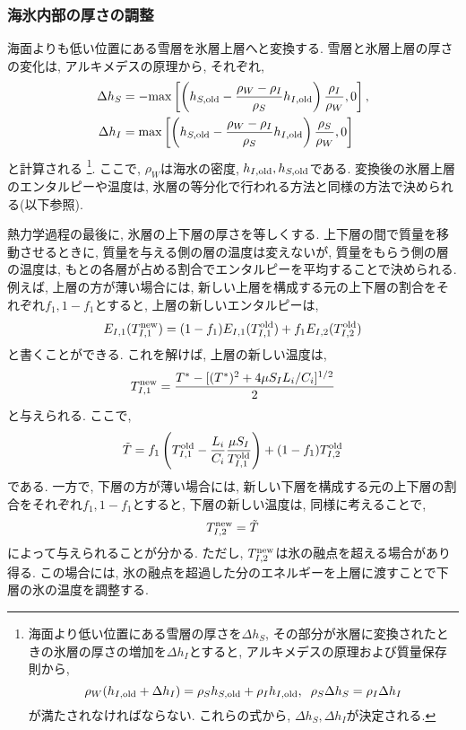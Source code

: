 \subsubsection*{海氷内部の厚さの調整}
海面よりも低い位置にある雪層を氷層上層へと変換する. 
雪層と氷層上層の厚さの変化は, アルキメデスの原理から,  
それぞれ, 
\begin{align*}
 \Delta h_S
 &= -{\rm max}
   \left[
    \left(h_{S,{\rm old}} - \dfrac{\rho_W-\rho_I}{\rho_S}h_{I,{\rm old}} \right)
    \dfrac{\rho_I}{\rho_W}, 0 \right], \\
 \Delta h_I
 &= {\rm max}
   \left[
   \left(h_{S,{\rm old}} - \dfrac{\rho_W-\rho_I}{\rho_S} h_{I,{\rm old}} \right)
   \dfrac{\rho_S}{\rho_W}, 0 \right]
\end{align*}
と計算される%
\footnote{
海面より低い位置にある雪層の厚さを$\Delta h_S$, 
その部分が氷層に変換されたときの氷層の厚さの増加を$\Delta h_I$とすると, 
アルキメデスの原理および質量保存則から, 
$$
\rho_W (h_{I,{\rm old}} + \Delta h_I)
   = \rho_S h_{S,{\rm old}} + \rho_I h_{I,{\rm old}},
\;\; 
\rho_S \Delta h_S = \rho_I \Delta h_I 
$$ 
が満たされなければならない. 
これらの式から, $\Delta h_S, \Delta h_I$が決定される. 
}. 
ここで, $\rho_W$は海水の密度, $h_{I,{\rm old}}, h_{S,{\rm old}}$である. 
変換後の氷層上層のエンタルピーや温度は, 氷層の等分化で行われる方法と同様の方法で決められる(以下参照).
 
熱力学過程の最後に, 氷層の上下層の厚さを等しくする. 
上下層の間で質量を移動させるときに, 質量を与える側の層の温度は変えないが, 
質量をもらう側の層の温度は, もとの各層が占める割合でエンタルピーを平均することで決められる.
例えば, 上層の方が薄い場合には, 新しい上層を構成する元の上下層の割合をそれぞれ$f_1, 1 - f_1$とすると, 
上層の新しいエンタルピーは, 
\begin{align*}
  E_{I,1}(T_{I,1}^{\rm new})
  = (1 - f_1) E_{I,1}(T_{I,1}^{\rm old}) + f_1 E_{I,2}(T_{I,2}^{\rm old})
\end{align*}
%
と書くことができる. 
これを解けば, 上層の新しい温度は, 
\begin{align*}
  T_{I,1}^{\rm new}
   = \dfrac{T^* - [(T^*)^2 + 4\mu S_I L_i /C_i]^{1/2}}{2}
\end{align*}
と与えられる. 
ここで, 
\begin{align*}
 \tilde{T} 
 =   f_1 \left(    T_{I,1}^{\rm old} 
               -  \dfrac{L_i}{C_i}\dfrac{\mu S_I}{T_{I,1}^{\rm old}} \right) 
   + (1 - f_1 ) T_{I,2}^{\rm old} 
\end{align*}
である. 
一方で, 下層の方が薄い場合には, 新しい下層を構成する元の上下層の割合をそれぞれ$f_1, 1 - f_1$とすると, 
下層の新しい温度は, 同様に考えることで, 
\begin{align*}
  T_{I,2}^{\rm new} = \tilde{T}
\end{align*}
によって与えられることが分かる. 
ただし, $T_{I,2}^{\rm new}$は氷の融点を超える場合があり得る. 
この場合には, 氷の融点を超過した分のエネルギーを上層に渡すことで下層の氷の温度を調整する. 

